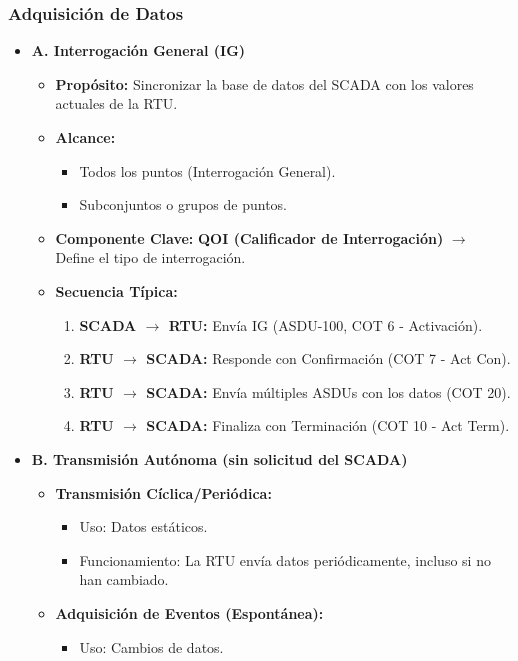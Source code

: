 \documentclass[a5paper]{book}%
\begin{document}
\subsubsection{Adquisición de Datos}
\begin{itemize}
	\item \textbf{A. Interrogación General (IG)}
	\begin{itemize}
		\item \textbf{Propósito:} Sincronizar la base de datos del SCADA con los valores actuales de la RTU.
		
		\item \textbf{Alcance:}
		\begin{itemize}
			\item Todos los puntos (Interrogación General).
			\item Subconjuntos o grupos de puntos.
		\end{itemize}
		\item \textbf{Componente Clave:} \textbf{QOI (Calificador de Interrogación)} $\rightarrow$ Define el tipo de interrogación.
		\item \textbf{Secuencia Típica:}
		\begin{enumerate}
			\item \textbf{SCADA $\rightarrow$ RTU:} Envía IG (ASDU-100, COT 6 - Activación).
			\item \textbf{RTU $\rightarrow$ SCADA:} Responde con Confirmación (COT 7 - Act Con).
			\item \textbf{RTU $\rightarrow$ SCADA:} Envía múltiples ASDUs con los datos (COT 20).
			\item \textbf{RTU $\rightarrow$ SCADA:} Finaliza con Terminación (COT 10 - Act Term).
		\end{enumerate}
	\end{itemize}
	\item \textbf{B. Transmisión Autónoma (sin solicitud del SCADA)}
	\begin{itemize}
		\item \textbf{Transmisión Cíclica/Periódica:}
		\begin{itemize}
			\item Uso: Datos estáticos.
			\item Funcionamiento: La RTU envía datos periódicamente, incluso si no han cambiado.
		\end{itemize}
		\item \textbf{Adquisición de Eventos (Espontánea):}
		\begin{itemize}
			\item Uso: Cambios de datos.

\end{itemize}
\end{itemize}
\end{itemize}
\end{document}

